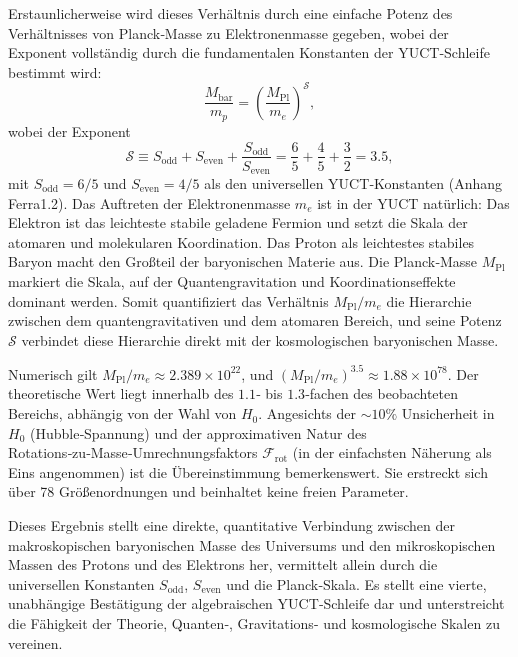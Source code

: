 \documentclass[11pt,a4paper]{article}
\newcommand{\Sodd}{S_{\mathrm{odd}}}
\newcommand{\Seven}{S_{\mathrm{even}}}
\begin{document}
	Erstaunlicherweise wird dieses Verhältnis durch eine einfache Potenz des Verhältnisses von Planck‑Masse zu Elektronenmasse gegeben, wobei der Exponent vollständig durch die fundamentalen Konstanten der YUCT‑Schleife bestimmt wird:
	\begin{equation}
		\boxed{ \frac{M_{\mathrm{bar}}}{m_p} = \left( \frac{M_{\mathrm{Pl}}}{m_e} \right)^{\mathcal{S}} },
		\label{eq:baryon-hierarchy}
	\end{equation}
	wobei der Exponent
	\begin{equation}
		\mathcal{S} \equiv \Sodd + \Seven + \frac{\Sodd}{\Seven} = \frac{6}{5} + \frac{4}{5} + \frac{3}{2} = 3.5,
	\end{equation}
	mit \(\Sodd = 6/5\) und \(\Seven = 4/5\) als den universellen YUCT‑Konstanten (Anhang Ferra1.2). Das Auftreten der Elektronenmasse \(m_e\) ist in der YUCT natürlich: Das Elektron ist das leichteste stabile geladene Fermion und setzt die Skala der atomaren und molekularen Koordination. Das Proton als leichtestes stabiles Baryon macht den Großteil der baryonischen Materie aus. Die Planck‑Masse \(M_{\mathrm{Pl}}\) markiert die Skala, auf der Quantengravitation und Koordinationseffekte dominant werden. Somit quantifiziert das Verhältnis \(M_{\mathrm{Pl}}/m_e\) die Hierarchie zwischen dem quantengravitativen und dem atomaren Bereich, und seine Potenz \(\mathcal{S}\) verbindet diese Hierarchie direkt mit der kosmologischen baryonischen Masse.
	
	Numerisch gilt \(M_{\mathrm{Pl}}/m_e \approx 2.389 \times 10^{22}\), und \((M_{\mathrm{Pl}}/m_e)^{3.5} \approx 1.88 \times 10^{78}\). Der theoretische Wert liegt innerhalb des \(1.1\)‑ bis \(1.3\)‑fachen des beobachteten Bereichs, abhängig von der Wahl von \(H_0\). Angesichts der \(\sim 10\%\) Unsicherheit in \(H_0\) (Hubble‑Spannung) und der approximativen Natur des Rotations‑zu‑Masse‑Umrechnungsfaktors \(\mathcal{F}_{\mathrm{rot}}\) (in der einfachsten Näherung als Eins angenommen) ist die Übereinstimmung bemerkenswert. Sie erstreckt sich über 78 Größenordnungen und beinhaltet keine freien Parameter.
	
	Dieses Ergebnis stellt eine direkte, quantitative Verbindung zwischen der makroskopischen baryonischen Masse des Universums und den mikroskopischen Massen des Protons und des Elektrons her, vermittelt allein durch die universellen Konstanten \(\Sodd\), \(\Seven\) und die Planck‑Skala. Es stellt eine vierte, unabhängige Bestätigung der algebraischen YUCT‑Schleife dar und unterstreicht die Fähigkeit der Theorie, Quanten‑, Gravitations- und kosmologische Skalen zu vereinen.
	
\end{document}
